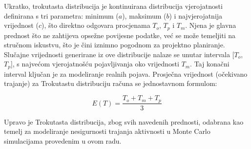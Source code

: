 Ukratko, trokutasta distribucija je kontinuirana distribucija vjerojatnosti definirana s tri parametra: minimum ($a$), maksimum ($b$) i najvjerojatnija vrijednost ($c$), što direktno odgovara procjenama $T_o$, $T_p$ i $T_m$. Njena je glavna prednost što ne zahtijeva opsežne povijesne podatke, već se može temeljiti na stručnom iskustvu, što je čini iznimno pogodnom za projektno planiranje. Slučajne vrijednosti generirane iz ove distribucije nalaze se unutar intervala [$T_o$, $T_p$], s najvećom vjerojatnošću pojavljivanja oko vrijednosti $T_m$.  Taj konačni interval ključan je za modeliranje realnih pojava. Prosječna vrijednost (očekivano trajanje) za Trokutastu distribuciju računa se jednostavnom formulom:

$$
E(T) = \frac{T_o + T_m + T_p}{3}
$$

Upravo je Trokutasta distribucija, zbog svih navedenih prednosti, odabrana kao temelj za modeliranje nesigurnosti trajanja aktivnosti u Monte Carlo simulacijama provedenim u ovom radu.

